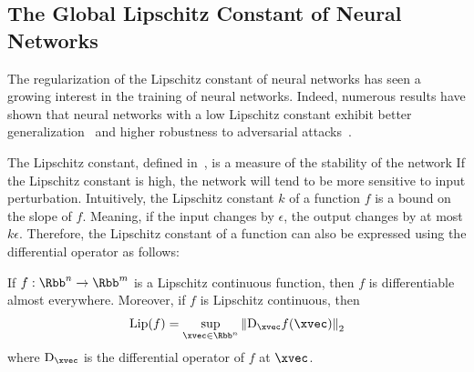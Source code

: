 
\subsection{The Global Lipschitz Constant of Neural Networks}
\label{subsection:ch3-the_global_lipschitz_constant_of_neural_networks}

\noindent
The regularization of the Lipschitz constant of neural networks has seen a growing interest in the training of neural networks.
Indeed, numerous results have shown that neural networks with a low Lipschitz constant exhibit better generalization~\cite{bartlett2017spectrally} and higher robustness to adversarial attacks~\cite{szegedy2013intriguing,tsuzuku2018lipschitz, farnia2018generalizable}.

The Lipschitz constant, defined in~, is a measure of the stability of the network
If the Lipschitz constant is high, the network will tend to be more sensitive to input perturbation.
Intuitively, the Lipschitz constant $k$ of a function $f$ is a bound on the slope of $f$.
Meaning, if the input changes by $\epsilon$, the output changes by at most $k\epsilon$.
Therefore, the Lipschitz constant of a function can also be expressed using the differential operator as follows:
\begin{theorem} \label{theorem:ch3-lipschitz_differential_op}
  If $f: \Rbb^n \rightarrow \Rbb^m$ is a Lipschitz continuous function, then $f$ is differentiable almost everywhere.
  Moreover, if $f$ is Lipschitz continuous, then
  \begin{align}
    \lip{f} = \sup_{\xvec \in \Rbb^n} \norm{\mathrm{D}_\xvec f(\xvec)}_2
  \end{align}
  where $\mathrm{D}_\xvec$ is the differential operator of $f$ at $\xvec$.
\end{theorem}

